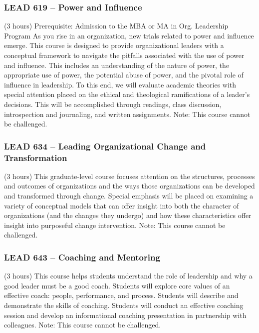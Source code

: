 \subsubsection{LEAD 619 -- Power and Influence}%
\label{course:LEAD:619}
(3 hours) Prerequisite: Admission to the MBA or MA in Org. Leadership Program As you rise in an organization, new trials related to power and influence emerge. This course is designed to provide organizational leaders with a conceptual framework to navigate the pitfalls associated with the use of power and influence. This includes an understanding of the nature of power, the appropriate use of power, the potential abuse of power, and the pivotal role of influence in leadership. To this end, we will evaluate academic theories with special attention placed on the ethical and theological ramifications of a leader’s decisions. This will be accomplished through readings, class discussion, introspection and journaling, and written assignments. Note: This course cannot be challenged.

\subsubsection{LEAD 634 -- Leading Organizational Change and Transformation}%
\label{course:LEAD:634}
(3 hours) This graduate-level course focuses attention on the structures, processes and outcomes of organizations and the ways those organizations can be developed and transformed through change.  Special emphasis will be placed on examining a variety of conceptual models that can offer insight into both the character of organizations (and the changes they undergo) and how these characteristics offer insight into purposeful change intervention. Note: This course cannot be challenged.

\subsubsection{LEAD 643 -- Coaching and Mentoring}%
\label{course:LEAD:643}
(3 hours) This course helps students understand the role of leadership and why a good leader must be a good coach.  Students will explore core values of an effective coach: people, performance, and process. Students will describe and demonstrate the skills of coaching.  Students will conduct an effective coaching session and develop an informational coaching presentation in partnership with colleagues.  Note: This course cannot be challenged.


